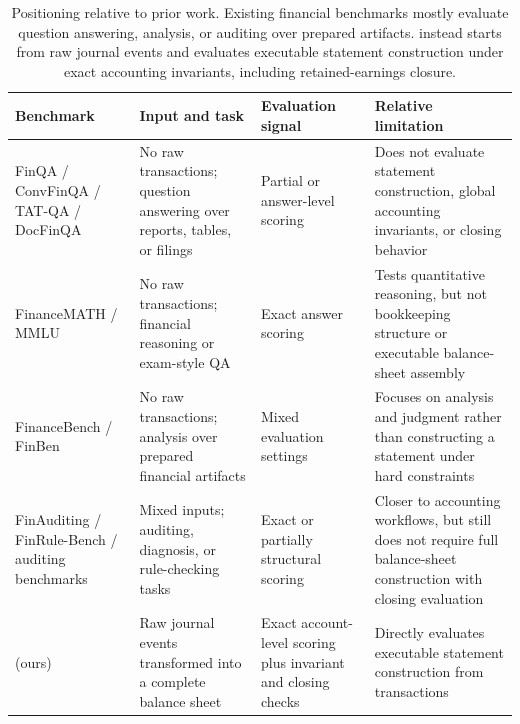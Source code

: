 \begin{table}[t]
\centering
\small
\setlength{\tabcolsep}{4pt}
\begin{tabularx}{\linewidth}{>{\raggedright\arraybackslash}p{2.5cm}>{\raggedright\arraybackslash}p{2.9cm}>{\raggedright\arraybackslash}p{2.7cm}>{\raggedright\arraybackslash}X}
\toprule
Benchmark & Input and task & Evaluation signal & Relative limitation \\
\midrule
FinQA / ConvFinQA / TAT-QA / DocFinQA
& No raw transactions; question answering over reports, tables, or filings
& Partial or answer-level scoring
& Does not evaluate statement construction, global accounting invariants, or closing behavior \\
FinanceMATH / MMLU
& No raw transactions; financial reasoning or exam-style QA
& Exact answer scoring
& Tests quantitative reasoning, but not bookkeeping structure or executable balance-sheet assembly \\
FinanceBench / FinBen
& No raw transactions; analysis over prepared financial artifacts
& Mixed evaluation settings
& Focuses on analysis and judgment rather than constructing a statement under hard constraints \\
FinAuditing / FinRule-Bench / auditing benchmarks
& Mixed inputs; auditing, diagnosis, or rule-checking tasks
& Exact or partially structural scoring
& Closer to accounting workflows, but still does not require full balance-sheet construction with closing evaluation \\
\benchmark{} (ours)
& Raw journal events transformed into a complete balance sheet
& Exact account-level scoring plus invariant and closing checks
& Directly evaluates executable statement construction from transactions \\
\bottomrule
\end{tabularx}
\caption{Positioning relative to prior work. Existing financial benchmarks mostly evaluate question answering, analysis, or auditing over prepared artifacts. \benchmark{} instead starts from raw journal events and evaluates executable statement construction under exact accounting invariants, including retained-earnings closure.}
\label{tab:prior-work-comparison}
\end{table}
